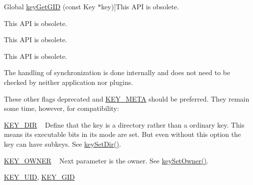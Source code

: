 \begin{DoxyRefList}
Global \hyperlink{group__meta_ga46a95e81d7d7f4e3eb59e60e5f3738c0}{key\+Get\+G\+I\+D} (const Key $\ast$key)]This A\+P\+I is obsolete. 
\item[\label{deprecated__deprecated000016}%
\hypertarget{deprecated__deprecated000016}{}%
Global \hyperlink{group__meta_gabc0cec592ce3b77e9bc33dbc8e8f6bdc}{key\+Get\+Mode} (const Key $\ast$key)]This A\+P\+I is obsolete. 
\item[\label{deprecated__deprecated000020}%
\hypertarget{deprecated__deprecated000020}{}%
Global \hyperlink{group__meta_ga57689eb5691679071463b777ae786ae9}{key\+Get\+M\+Time} (const Key $\ast$key)]This A\+P\+I is obsolete. 
\item[\label{deprecated__deprecated000011}%
\hypertarget{deprecated__deprecated000011}{}%
Global \hyperlink{group__meta_gacaa5060e67b03f50ae49a3620c54bc46}{key\+Get\+U\+I\+D} (const Key $\ast$key)]This A\+P\+I is obsolete. 
\item[\label{deprecated__deprecated000010}%
\hypertarget{deprecated__deprecated000010}{}%
Global \hyperlink{group__keytest_gaf247df0de7aca04b32ef80e39ef12950}{key\+Need\+Sync} (const Key $\ast$key)]The handling of synchronization is done internally and does not need to be checked by neither application nor plugins. 
\item[\label{deprecated__deprecated000008}%
\hypertarget{deprecated__deprecated000008}{}%
Global \hyperlink{group__key_gad23c65b44bf48d773759e1f9a4d43b89}{key\+New} (const char $\ast$name,...)]These other flags deprecated and \hyperlink{group__key_gga91fb3178848bd682000958089abbaf40a040582834bb2d90049947d7ef74e87e2}{K\+E\+Y\+\_\+\+M\+E\+T\+A} should be preferred. They remain some time, however, for compatibility\+:
\begin{DoxyItemize}
\item \hyperlink{group__key_gga91fb3178848bd682000958089abbaf40a9e43e47c8a21478538e2d20e049981d5}{K\+E\+Y\+\_\+\+D\+I\+R} ~\newline
 Define that the key is a directory rather than a ordinary key. This means its executable bits in its mode are set. But even without this option the key can have subkeys. See \hyperlink{group__meta_gaae575bd86a628a15ee45baa860522e75}{key\+Set\+Dir()}.
\item \hyperlink{group__key_gga91fb3178848bd682000958089abbaf40a77ca60362fa8daca8d5347db4385068b}{K\+E\+Y\+\_\+\+O\+W\+N\+E\+R} ~\newline
 Next parameter is the owner. See \hyperlink{group__meta_ga88d6ec200ba0707b7c1b4a88133d2be4}{key\+Set\+Owner()}.
\item \hyperlink{group__key_gga91fb3178848bd682000958089abbaf40a28f01a87d65f065172f734c9c9446c0e}{K\+E\+Y\+\_\+\+U\+I\+D}, \hyperlink{group__key_gga91fb3178848bd682000958089abbaf40ac0628bbaba7c837ca73323681393d15f}{K\+E\+Y\+\_\+\+G\+I\+D} ~\newline

\end{DoxyItemize}
\end{DoxyRefList}
